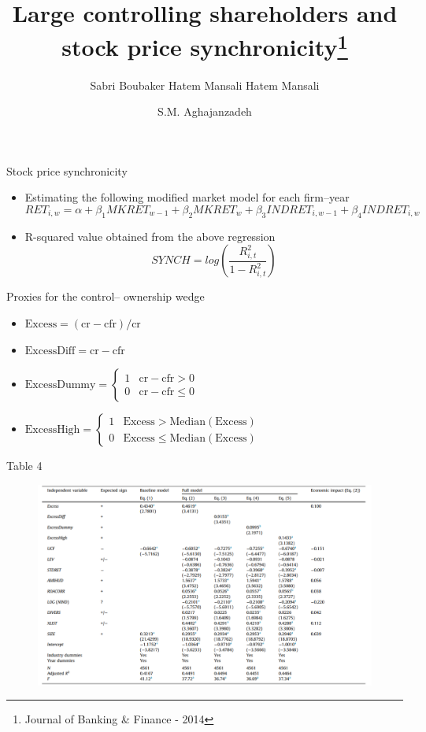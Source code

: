 \documentclass{beamer}
\title[Price Synchronicity]{ \large Large controlling shareholders and stock price synchronicity\footnote{ \tiny Journal of Banking \& Finance - 2014}}
\subtitle{\normalsize Sabri Boubaker  \qquad Hatem Mansali \qquad Hatem Mansali}
\author[Aghajanzadeh]{S.M. Aghajanzadeh  }
\institute[]{Tehran Institute for Advanced Studies }
\begin{document}
{\maketitle}
\small

\begin{frame}{Stock price synchronicity}
	\begin{itemize}
		\item  Estimating the following modified
		market model for each firm–year
		\begin{equation*}
			RET_{i,w} = \alpha + \beta_1 MKRET_{w-1}  + \beta_2 MKRET_{w}  + \beta_3 INDRET_{i,w-1}  + \beta_4 INDRET_{i,w}
		\end{equation*}
	\item  R-squared value obtained from the above regression
	\begin{equation*}
		SYNCH = log(\frac{R^2_{i,t}}{1-R^2_{i,t}})
	\end{equation*}
	\end{itemize}
\end{frame}
\begin{frame}{Proxies for the control–	ownership wedge }
	
	\begin{itemize}
		\item $ \text{Excess} = (\text{cr} - \text{cfr})/\text{cr} $
		\item $ \text{ExcessDiff} = \text{cr} - \text{cfr} $
		\item $ \text{ExcessDummy} = \left\{\begin{array}{ll}
			1 & \text{cr} - \text{cfr}>0\\
			0 & \text{cr} - \text{cfr}\leq 0
		\end{array}\right.  $
	\item $ \text{ExcessHigh} = \left\{\begin{array}{ll}
		1 & \text{Excess}>\text{Median}(\text{Excess})\\
		0 & \text{Excess}\leq \text{Median}(\text{Excess})
	\end{array}\right.  $
	\end{itemize}
	
\end{frame}
\begin{frame}{Table 4}
\begin{figure}
	\centering
	\includegraphics[width=0.9\linewidth]{t4}
	\label{fig:t4}
\end{figure}
\end{frame}
\end{document}
